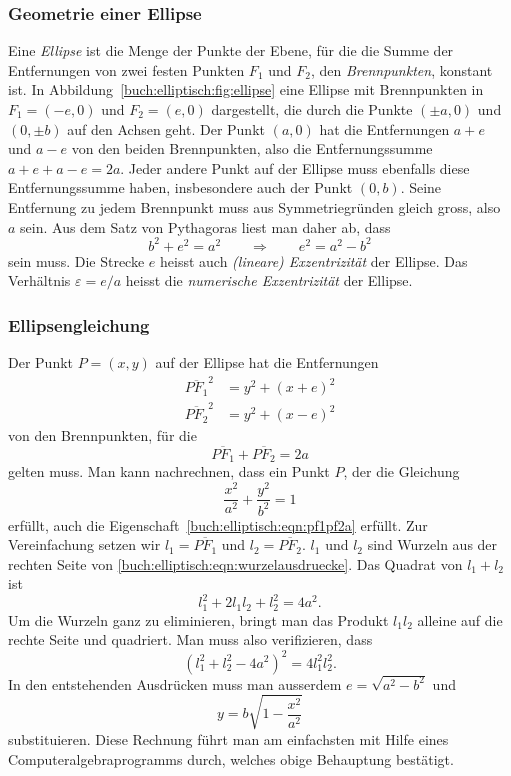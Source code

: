 \subsubsection{Geometrie einer Ellipse}
Eine {\em Ellipse} ist die Menge der Punkte der Ebene, für die die Summe
%
der Entfernungen von zwei festen Punkten $F_1$ und $F_2$,
den {\em Brennpunkten}, konstant ist.
%
In Abbildung~\ref{buch:elliptisch:fig:ellipse} eine Ellipse
mit Brennpunkten in $F_1=(-e,0)$ und $F_2=(e,0)$ dargestellt,
die durch die Punkte $(\pm a,0)$ und $(0,\pm b)$ auf den Achsen geht.
Der Punkt $(a,0)$ hat die Entfernungen $a+e$ und $a-e$ von den beiden
Brennpunkten, also die Entfernungssumme $a+e+a-e=2a$.
Jeder andere Punkt auf der Ellipse muss ebenfalls diese Entfernungssumme
haben, insbesondere auch der Punkt $(0,b)$.
Seine Entfernung zu jedem Brennpunkt muss aus Symmetriegründen gleich gross,
also $a$ sein.
Aus dem Satz von Pythagoras liest man daher ab, dass
\[
b^2+e^2=a^2
\qquad\Rightarrow\qquad
e^2 = a^2-b^2
\]
sein muss.
Die Strecke $e$ heisst auch {\em (lineare) Exzentrizität} der Ellipse.
Das Verhältnis $\varepsilon= e/a$  heisst die {\em numerische Exzentrizität}
der Ellipse.

%
%
\subsubsection{Ellipsengleichung}
Der Punkt $P=(x,y)$ auf der Ellipse hat die Entfernungen
\begin{equation}
\begin{aligned}
\overline{PF_1}^2
&=
y^2 + (x+e)^2
\\
\overline{PF_2}^2
&=
y^2 + (x-e)^2
\end{aligned}
\label{buch:elliptisch:eqn:wurzelausdruecke}
\end{equation}
von den Brennpunkten, für die 
\begin{equation}
\overline{PF_1}+\overline{PF_2}
=
2a
\label{buch:elliptisch:eqn:pf1pf2a}
\end{equation}
gelten muss.
Man kann nachrechnen, dass ein Punkt $P$, der die Gleichung
\[
\frac{x^2}{a^2} + \frac{y^2}{b^2}=1
\]
erfüllt, auch die Eigenschaft~\eqref{buch:elliptisch:eqn:pf1pf2a}
erfüllt.
Zur Vereinfachung setzen wir $l_1=\overline{PF_1}$ und $l_2=\overline{PF_2}$.
$l_1$ und $l_2$ sind Wurzeln aus der rechten Seite von
\eqref{buch:elliptisch:eqn:wurzelausdruecke}.
Das Quadrat von $l_1+l_2$ ist
\[
l_1^2 + 2l_1l_2 + l_2^2 = 4a^2.
\]
Um die Wurzeln ganz zu eliminieren, bringt man das Produkt $l_1l_2$ alleine
auf die rechte Seite und quadriert.
Man muss also verifizieren, dass
\[
(l_1^2 + l_2^2 -4a^2)^2 = 4l_1^2l_2^2.
\]
In den entstehenden Ausdrücken muss man ausserdem $e=\sqrt{a^2-b^2}$ und
\[
y=b\sqrt{1-\frac{x^2}{a^2}}
\]
substituieren.
Diese Rechnung führt man am einfachsten mit Hilfe eines
Computeralgebraprogramms durch, welches obige Behauptung bestätigt.

